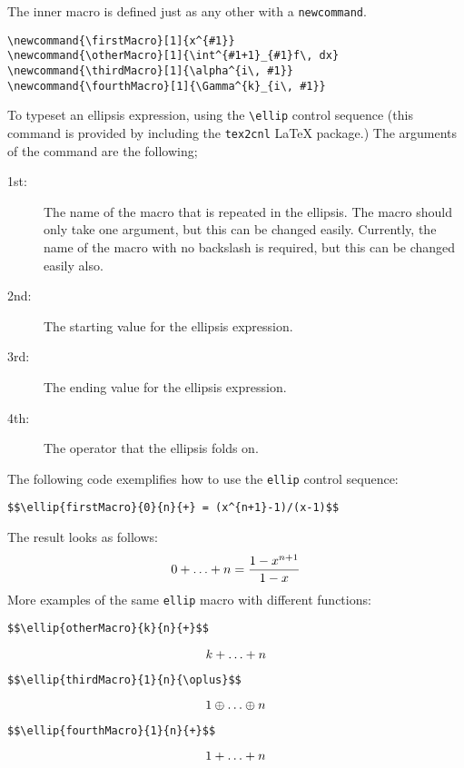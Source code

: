 \documentclass{article}
\newcommand{\firstMacro}[1]{x^{#1}}
\newcommand{\otherMacro}[1]{\int^{#1+1}_{#1}f\, dx}
\newcommand{\thirdMacro}[1]{\alpha^{i\, #1}}
\newcommand{\fourthMacro}[1]{\Gamma^{k}_{i\, #1}}
\begin{document}
The inner macro is defined just as any other with a \texttt{newcommand}.
\begin{verbatim}
\newcommand{\firstMacro}[1]{x^{#1}}
\newcommand{\otherMacro}[1]{\int^{#1+1}_{#1}f\, dx}
\newcommand{\thirdMacro}[1]{\alpha^{i\, #1}}
\newcommand{\fourthMacro}[1]{\Gamma^{k}_{i\, #1}}
\end{verbatim}
To typeset an ellipsis expression, using the \verb!\ellip! control sequence (this command is provided by including the \texttt{tex2cnl} LaTeX package.) The arguments of the command are the following;
\begin{description}
\item[1st:] The name of the macro that is repeated in the ellipsis. The macro should only take one argument, but this can be changed easily. Currently, the name of the macro with no backslash is required, but this can be changed easily also.
\item[2nd:] The starting value for the ellipsis expression.
\item[3rd:] The ending value for the ellipsis expression.
\item[4th:] The operator that the ellipsis folds on.
\end{description}
The following code exemplifies how to use the \texttt{ellip} control sequence:
\begin{verbatim}
$$\ellip{firstMacro}{0}{n}{+} = (x^{n+1}-1)/(x-1)$$ 
\end{verbatim}
The result looks as follows:
$$\ellip{firstMacro}{0}{n}{+} = \frac{1-x^{n+1}}{1-x}$$ 
More examples of the same \texttt{ellip} macro with different functions:
\begin{verbatim}
$$\ellip{otherMacro}{k}{n}{+}$$ 
\end{verbatim}
$$\ellip{otherMacro}{k}{n}{+}$$ 
\begin{verbatim}
$$\ellip{thirdMacro}{1}{n}{\oplus}$$ 
\end{verbatim}
$$\ellip{thirdMacro}{1}{n}{\oplus}$$ 
\begin{verbatim}
$$\ellip{fourthMacro}{1}{n}{+}$$ 
\end{verbatim}
$$\ellip{fourthMacro}{1}{n}{+}$$ 
\end{document}
